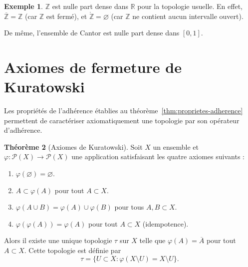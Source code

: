 \documentclass[12pt,a4paper,openany]{book}
\theoremstyle{definition}
\theoremstyle{cours}
\newtheorem{theoreme}{Théorème}[chapter]
\theoremstyle{coursnormal}
\newtheorem{exemple}[theoreme]{Exemple}
\newcommand{\Z}{\mathbb{Z}}
\newcommand{\R}{\mathbb{R}}
\newcommand{\Int}[1]{\mathring{#1}}
\newcommand{\Cl}[1]{\overline{#1}}
\begin{document}
\begin{exemple}\label{ex:Z-nulle-part-dense}
  $\Z$ est nulle part dense dans $\R$ pour la topologie usuelle. En effet, $\Cl{\Z} = \Z$ (car $\Z$ est fermé), et $\Int{\Z} = \varnothing$ (car $\Z$ ne contient aucun intervalle ouvert).

  De même, l'ensemble de Cantor est nulle part dense dans $[0,1]$.
\end{exemple}

\section{Axiomes de fermeture de Kuratowski}
\label{sec:kuratowski-axiomes}


Les propriétés de l'adhérence établies au théorème~\ref{thm:proprietes-adherence} permettent de caractériser axiomatiquement une topologie par son opérateur d'adhérence.

\begin{theoreme}[Axiomes de Kuratowski]\label{thm:kuratowski-axiomes}
  Soit $X$ un ensemble et $\varphi : \mathcal{P}(X) \to \mathcal{P}(X)$ une application satisfaisant les quatre axiomes suivants :
  \begin{enumerate}[label=\textbf{(K\arabic*)}]
    \item\label{ax:K1} $\varphi(\varnothing) = \varnothing$.
    \item\label{ax:K2} $A \subset \varphi(A)$ pour tout $A \subset X$.
    \item\label{ax:K3} $\varphi(A \cup B) = \varphi(A) \cup \varphi(B)$ pour tous $A, B \subset X$.
    \item\label{ax:K4} $\varphi(\varphi(A)) = \varphi(A)$ pour tout $A \subset X$ (idempotence).
  \end{enumerate}
  Alors il existe une unique topologie $\tau$ sur $X$ telle que $\varphi(A) = \Cl{A}$ pour tout $A \subset X$. Cette topologie est définie par
  \[
    \tau = \{U \subset X : \varphi(X \setminus U) = X \setminus U\}.
  \]
\end{theoreme}
\end{document}
